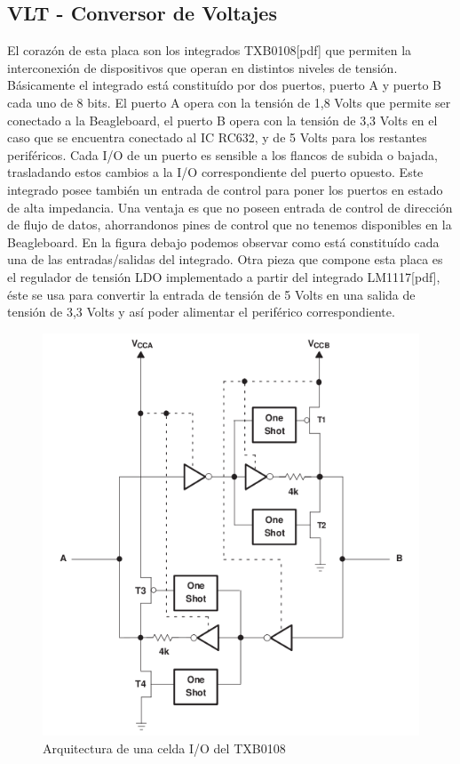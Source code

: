 \subsection{VLT - Conversor de Voltajes}
El corazón de esta placa son los integrados TXB0108[pdf] que permiten la interconexión de dispositivos que operan en distintos niveles de tensión. Básicamente el integrado está constituído por dos puertos, puerto A y puerto B cada uno de 8 bits. El puerto A opera con la tensión de 1,8 Volts que permite ser conectado a la Beagleboard, el puerto B opera con la tensión de 3,3 Volts en el caso que se encuentra conectado al IC RC632, y de 5 Volts para los restantes periféricos.
Cada I/O de un puerto es sensible a los flancos de subida o bajada, trasladando estos cambios a la I/O correspondiente del puerto opuesto. 
Este integrado posee también un entrada de control para poner los puertos en estado de alta impedancia.
Una ventaja es que no poseen entrada de control de dirección de flujo de datos, ahorrandonos pines de control que no tenemos disponibles en la Beagleboard.
En la figura debajo podemos observar como está constituído cada una de las entradas/salidas del integrado.
Otra pieza que compone esta placa es el regulador de tensión LDO implementado a partir del integrado LM1117[pdf], éste se usa para convertir la entrada de tensión de 5 Volts en una salida de tensión de 3,3 Volts y así poder alimentar el periférico correspondiente.

\begin{figure}[H]
\centering
  \begin{center}
  \includegraphics[scale=.4]{Imagenes/TXB0108.png} 
  \end{center}
  \caption{Arquitectura de una celda I/O del TXB0108}\label{Fig:HW} 
\end{figure}

